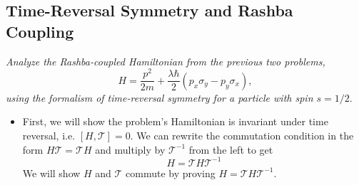 \documentclass[11pt, a4paper]{article}
\newcommand{\T}{\mathcal{T}}  %
\begin{document}
	
	
	
\subsection{Time-Reversal Symmetry and Rashba Coupling}
\textit{Analyze the Rashba-coupled Hamiltonian from the previous two problems,}
\begin{equation*}
	H = \frac{p^{2}}{2m} + \frac{\lambda\hbar}{2} (p_{x}\sigma_{y} - p_{y}\sigma_{x}),
\end{equation*}
\textit{using the formalism of time-reversal symmetry for a particle with spin $ s = 1/2 $}.

\begin{itemize}	
	\item First, we will show the problem's Hamiltonian is invariant under time reversal, i.e. $ [H, \T] = 0 $. We can rewrite the commutation condition in the form $ H\T = \T H $ and multiply by $ \T^{-1} $ from the left to get
	\begin{equation*}
		H = \T H \T^{-1}
	\end{equation*}
	We will show $ H $ and $ \T $ commute by proving $ H = \T H \T^{-1} $.
	

\end{itemize}
\end{document}
